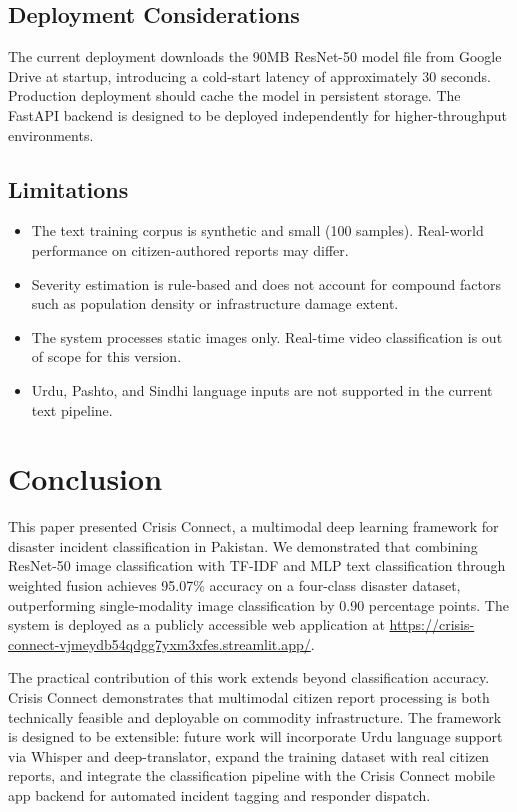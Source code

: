 \documentclass[conference]{IEEEtran}
\begin{document}
\subsection{Deployment Considerations}

The current deployment downloads the 90MB ResNet-50 model file from Google Drive at startup, introducing a cold-start latency of approximately 30 seconds. Production deployment should cache the model in persistent storage. The FastAPI backend is designed to be deployed independently for higher-throughput environments.

\subsection{Limitations}

\begin{itemize}
    \item The text training corpus is synthetic and small (100 samples). Real-world performance on citizen-authored reports may differ.
    \item Severity estimation is rule-based and does not account for compound factors such as population density or infrastructure damage extent.
    \item The system processes static images only. Real-time video classification is out of scope for this version.
    \item Urdu, Pashto, and Sindhi language inputs are not supported in the current text pipeline.
\end{itemize}

\section{Conclusion}
\label{sec:conclusion}

This paper presented Crisis Connect, a multimodal deep learning framework for disaster incident classification in Pakistan. We demonstrated that combining ResNet-50 image classification with TF-IDF and MLP text classification through weighted fusion achieves 95.07\% accuracy on a four-class disaster dataset, outperforming single-modality image classification by 0.90 percentage points. The system is deployed as a publicly accessible web application at \url{https://crisis-connect-vjmeydb54qdgg7yxm3xfes.streamlit.app/}.

The practical contribution of this work extends beyond classification accuracy. Crisis Connect demonstrates that multimodal citizen report processing is both technically feasible and deployable on commodity infrastructure. The framework is designed to be extensible: future work will incorporate Urdu language support via Whisper and deep-translator, expand the training dataset with real citizen reports, and integrate the classification pipeline with the Crisis Connect mobile app backend for automated incident tagging and responder dispatch.
\end{document}
